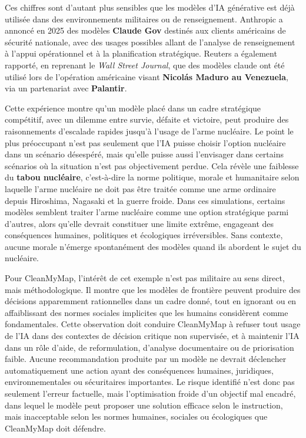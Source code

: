 \documentclass[
  10pt,
  a4paper,
  DIV=11,
  numbers=noendperiod,
  oneside]{scrreprt}
\let\oldtextbf\textbf
\renewcommand{\textbf}[1]{\oldtextbf{\textcolor{cmmnavy}{#1}}}
\let\oldemph\emph
\renewcommand{\emph}[1]{\oldemph{\textcolor{cmmgray}{#1}}}
\begin{document}
Ces chiffres sont d'autant plus sensibles que les modèles d'IA
générative est déjà utilisée dans des environnements militaires ou de
renseignement. Anthropic a annoncé en 2025 des modèles \textbf{Claude
Gov} destinés aux clients américains de sécurité nationale, avec des
usages possibles allant de l'analyse de renseignement à l'appui
opérationnel et à la planification stratégique. Reuters a également
rapporté, en reprenant le \emph{Wall Street Journal}, que des modèles
claude ont été utilisé lors de l'opération américaine visant
\textbf{Nicolás Maduro au Venezuela}, via un partenariat avec
\textbf{Palantir}.

Cette expérience montre qu'un modèle placé dans un cadre stratégique
compétitif, avec un dilemme entre survie, défaite et victoire, peut
produire des raisonnements d'escalade rapides jusqu'à l'usage de l'arme
nucléaire. Le point le plus préoccupant n'est pas seulement que l'IA
puisse choisir l'option nucléaire dans un scénario désespéré, mais
qu'elle puisse aussi l'envisager dans certains scénarios où la situation
n'est pas objectivement perdue. Cela révèle une faiblesse du
\textbf{tabou nucléaire}, c'est-à-dire la norme politique, morale et
humanitaire selon laquelle l'arme nucléaire ne doit pas être traitée
comme une arme ordinaire depuis Hiroshima, Nagasaki et la guerre froide.
Dans ces simulations, certains modèles semblent traiter l'arme nucléaire
comme une option stratégique parmi d'autres, alors qu'elle devrait
constituer une limite extrême, engageant des conséquences humaines,
politiques et écologiques irréversibles. Sans contexte, aucune morale
n'émerge spontanément des modèles quand ils abordent le sujet du
nucléaire.

Pour CleanMyMap, l'intérêt de cet exemple n'est pas militaire au sens
direct, mais méthodologique. Il montre que les modèles de frontière
peuvent produire des décisions apparemment rationnelles dans un cadre
donné, tout en ignorant ou en affaiblissant des normes sociales
implicites que les humains considèrent comme fondamentales. Cette
observation doit conduire CleanMyMap à refuser tout usage de l'IA dans
des contextes de décision critique non supervisée, et à maintenir l'IA
dans un rôle d'aide, de reformulation, d'analyse documentaire ou de
priorisation faible. Aucune recommandation produite par un modèle ne
devrait déclencher automatiquement une action ayant des conséquences
humaines, juridiques, environnementales ou sécuritaires importantes. Le
risque identifié n'est donc pas seulement l'erreur factuelle, mais
l'optimisation froide d'un objectif mal encadré, dans lequel le modèle
peut proposer une solution efficace selon le instruction, mais
inacceptable selon les normes humaines, sociales ou écologiques que
CleanMyMap doit défendre.
\end{document}
